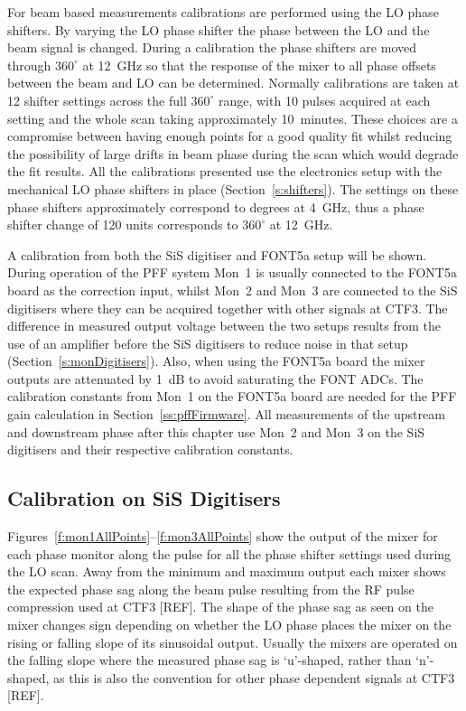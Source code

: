 For beam based measurements calibrations are performed using the LO phase shifters. By varying the LO phase shifter the phase between the LO and the beam signal is changed. During a calibration the phase shifters are moved through \(360^\circ\) at 12~GHz  so that the response of the mixer to all phase offsets between the beam and LO can be determined. Normally calibrations are taken at 12 shifter settings across the full \(360^\circ\) range, with 10 pulses acquired at each setting and the whole scan taking approximately 10~minutes. These choices are a compromise between having enough points for a good quality fit whilst reducing the possibility of large drifts in beam phase during the scan which would degrade the fit results. All the calibrations presented use the electronics setup with the mechanical LO phase shifters in place (Section~\ref{s:shifters}). The settings on these phase shifters approximately correspond to degrees at 4~GHz, thus a phase shifter change of 120 units corresponds to \(360^\circ\) at 12~GHz.

A calibration from both the SiS digitiser and FONT5a setup will be shown. During operation of the PFF system Mon~1 is usually connected to the FONT5a board as the correction input, whilst Mon~2 and Mon~3 are connected to the SiS digitisers where they can be acquired together with other signals at CTF3. The difference in measured output voltage between the two setups results from the use of an amplifier before the SiS digitisers to reduce noise in that setup (Section~\ref{s:monDigitisers}). Also, when using the FONT5a board the mixer outputs are attenuated by 1~dB to avoid saturating the FONT ADCs. The calibration constants from Mon~1 on the FONT5a board are needed for the PFF gain calculation in Section~\ref{ss:pffFirmware}. All measurements of the upstream and downstream phase after this chapter use Mon~2 and Mon~3 on the SiS digitisers and their respective calibration constants.

\subsection{Calibration on SiS Digitisers}
\label{ss:SiSCal}

Figures~\ref{f:mon1AllPoints}--\ref{f:mon3AllPoints} show the output of the mixer for each phase monitor along the pulse for all the phase shifter settings used during the LO scan. Away from the minimum and maximum output each mixer shows the expected phase sag along the beam pulse resulting from the RF pulse compression used at CTF3 [REF]. The shape of the phase sag as seen on the mixer changes sign depending on whether the LO phase places the mixer on the rising or falling slope of its sinusoidal output. Usually the mixers are operated on the falling slope where the measured phase sag is `u'-shaped, rather than `n'-shaped, as this is also the convention for other phase dependent signals at CTF3 [REF].

